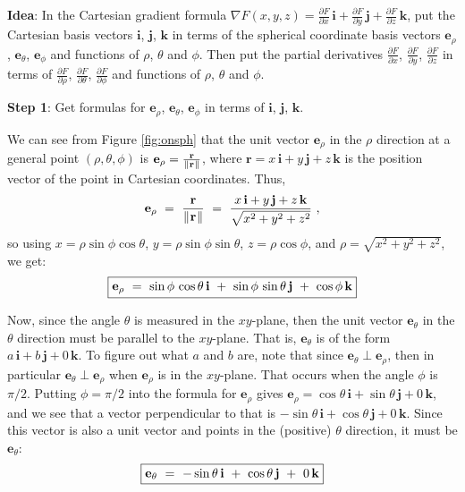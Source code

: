 \par\noindent\textbf{Idea}: In the Cartesian gradient formula $\nabla F(x,y,z) =
\frac{\partial F}{\partial x}\,\mathbf{i} + \frac{\partial F}{\partial y}\,\mathbf{j} +
\frac{\partial F}{\partial z}\,\mathbf{k}$, put the Cartesian basis vectors $\mathbf{i}$, $\mathbf{j}$, $\mathbf{k}$ in terms
of the spherical coordinate basis vectors $\mathbf{e}_{\rho}$, $\mathbf{e}_{\theta}$, $\mathbf{e}_{\phi}$ and functions
of $\rho$, $\theta$ and $\phi$. Then put the partial derivatives $\frac{\partial F}{\partial x}$,
$\frac{\partial F}{\partial y}$, $\frac{\partial F}{\partial z}$ in terms of $\frac{\partial F}{\partial \rho}$,
$\frac{\partial F}{\partial \theta}$, $\frac{\partial F}{\partial \phi}$ and functions of $\rho$, $\theta$ and $\phi$.\\

\par\noindent\textbf{Step 1}: Get formulas for $\mathbf{e}_{\rho}$, $\mathbf{e}_{\theta}$, $\mathbf{e}_{\phi}$ in terms
of $\mathbf{i}$, $\mathbf{j}$, $\mathbf{k}$.

We can see from Figure \ref{fig:onsph} that the unit vector $\mathbf{e}_{\rho}$ in the $\rho$ direction at
a general point $(\rho,\theta,\phi)$ is $\mathbf{e}_{\rho} = \frac{\mathbf{r}}{\lVert\mspace{1mu}\mathbf{r}\mspace{1mu}\rVert}$, where 
$\mathbf{r} = x\,\mathbf{i} + y\,\mathbf{j} + z\,\mathbf{k}$ is the position vector of the point in Cartesian
coordinates. Thus,
\begin{displaymath}
 \mathbf{e}_{\rho} ~=~ \frac{\mathbf{r}}{\lVert\mspace{1mu}\mathbf{r}\mspace{1mu}\rVert}
  ~=~ \frac{x\,\mathbf{i} + y\,\mathbf{j} + z\,\mathbf{k}}{\sqrt{x^2 + y^2 + z^2}} ~,
\end{displaymath}
so using $x=\rho\sin \phi \cos \theta$, $y=\rho\sin \phi \sin \theta$, $z=\rho\cos \phi$, and
$\rho = \sqrt{x^2 + y^2 + z^2}$, we get:
\begin{displaymath}
 \fbox{$\mathbf{e}_{\rho} ~=~ \sin\phi\,\cos\theta\,\mathbf{i} ~+~ \sin\phi\,\sin\theta\,\mathbf{j} ~+~ \cos\phi\,\mathbf{k}$}
\end{displaymath}

Now, since the angle $\theta$ is measured in the $xy$-plane, then the unit vector $\mathbf{e}_{\theta}$ in the $\theta$
direction must be parallel to the $xy$-plane. That is, $\mathbf{e}_{\theta}$ is of the form $a\,\mathbf{i} +
b\,\mathbf{j} + 0\,\mathbf{k}$. To figure out what $a$ and $b$ are, note that since $\mathbf{e}_{\theta} \perp
\mathbf{e}_{\rho}$, then in particular $\mathbf{e}_{\theta} \perp \mathbf{e}_{\rho}$ when $\mathbf{e}_{\rho}$ is in the
$xy$-plane. That occurs when the angle $\phi$ is $\pi/2$. Putting $\phi = \pi/2$ into the formula for
$\mathbf{e}_{\rho}$ gives $\mathbf{e}_{\rho} = \cos\theta\,\mathbf{i} + \sin\theta\,\mathbf{j} + 0\,\mathbf{k}$, and
we see that a vector perpendicular to that is $-\sin\theta\,\mathbf{i} + \cos\theta\,\mathbf{j} + 0\,\mathbf{k}$. Since
this vector is also a unit vector and points in the (positive) $\theta$ direction, it must be $\mathbf{e}_{\theta}$:
\begin{displaymath}
 \fbox{$\mathbf{e}_{\theta} ~=~ -\sin\theta\,\mathbf{i} ~+~ \cos\theta\,\mathbf{j} ~+~ 0\,\mathbf{k}$}
\end{displaymath}


